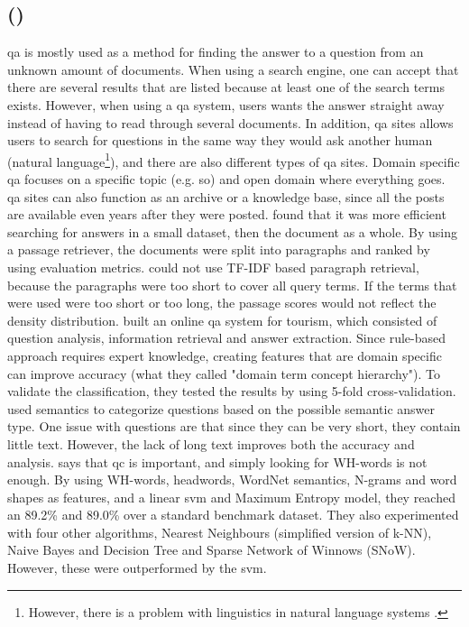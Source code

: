 \subsection[Question-Answering]{ ()}
\label{sec:question_answering}
\gls{qa} is mostly used as a method for finding the answer to a question from an unknown amount of documents.
When using a search engine, one can accept that there are several results that are listed because at least one of the search terms exists. 
However, when using a \gls{qa} system, users wants the answer straight away instead of having to read through several documents. 
In addition, \gls{qa} sites allows users to search for questions in the same way they would ask another human (natural language\footnote{
	However, there is a problem with linguistics in natural language systems \cite{Lopez2011}.
	}), 
and there are also different types of \gls{qa} sites.
Domain specific \gls{qa} focuses on a specific topic (e.g. \gls{so}) and open domain where everything goes. 
\gls{qa} sites can also function as an archive or a knowledge base, since all the posts are available even years after they were posted.
\vspace{0.5em}\newline
\textcite{Yen2013} found that it was more efficient searching for answers in a small dataset, then the document as a whole. 
By using a passage retriever, the documents were split into paragraphs and ranked by using evaluation metrics. 
\textcite{Isozaki2005} could not use TF-IDF based paragraph retrieval, because the paragraphs were too short to cover all query terms. 
If the terms that were used were too short or too long, the passage scores would not reflect the density distribution. 
\textcite{Xu2012} built an online \gls{qa} system for tourism, which consisted of question analysis, information retrieval and answer extraction.
Since rule-based approach requires expert knowledge, creating features that are domain specific can improve accuracy (what they called "domain term concept hierarchy").
To validate the classification, they tested the results by using 5-fold cross-validation.
\vspace{0.5em}\newline
\textcite{Li} used semantics to categorize questions based on the possible semantic answer type. 
One issue with questions are that since they can be very short, they contain little text. 
However, the lack of long text improves both the accuracy and analysis. 
\vspace{0.5em}\newline
\textcite{Zhang2003} says that \gls{qc} is important, and simply looking for WH-words is not enough. 
By using WH-words, headwords, WordNet semantics, N-grams and word shapes as features, and a linear \gls{svm} and Maximum Entropy model, 
they reached an 89.2\% and 89.0\% over a standard benchmark dataset. 
They also experimented with four other algorithms, Nearest Neighbours (simplified version of k-NN),  Naive Bayes and Decision Tree and Sparse Network of Winnows (SNoW).
However, these were outperformed by the \gls{svm}.


